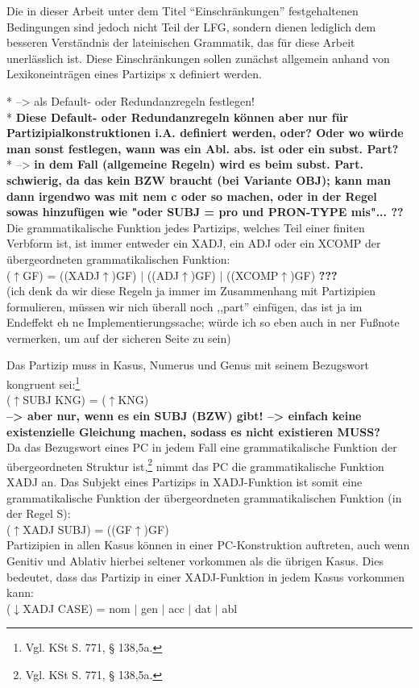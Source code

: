 \documentclass[12pt,a4paper]{article}
\begin{document}
Die in dieser Arbeit unter dem Titel ``Einschränkungen'' festgehaltenen Bedingungen sind jedoch nicht Teil der LFG, sondern dienen lediglich dem besseren Verständnis der lateinischen Grammatik, das für diese Arbeit unerlässlich ist. Diese Einschränkungen sollen zunächst allgemein anhand von Lexikoneinträgen eines Partizips x definiert werden. 

* --> als Default- oder Redundanzregeln festlegen! \\
* \textbf{Diese Default- oder Redundanzregeln können aber nur für Partizipialkonstruktionen i.A. definiert werden, oder? Oder wo würde man sonst festlegen, wann was ein Abl. abs. ist oder ein subst. Part?} \\
* --> \textbf{in dem Fall (allgemeine Regeln) wird es beim subst. Part. schwierig, da das kein BZW braucht (bei Variante OBJ); kann man dann irgendwo was mit nem c oder so machen, oder in der Regel sowas hinzufügen wie "oder SUBJ = pro und PRON-TYPE mis"... ??} \\

Die grammatikalische Funktion jedes Partizips, welches Teil einer finiten Verbform ist, ist immer entweder ein XADJ, ein ADJ oder ein XCOMP der übergeordneten grammatikalischen Funktion: \\
($\uparrow$GF) = ((XADJ$\uparrow$)GF) $\mid$ ((ADJ$\uparrow$)GF) $\mid$ ((XCOMP$\uparrow$)GF) \textbf{???} \\ 
(ich denk da wir diese Regeln ja immer im Zusammenhang mit Partizipien formulieren, müssen wir nich überall noch ,,part'' einfügen, das ist ja im Endeffekt eh ne Implementierungssache; würde ich so eben auch in ner Fußnote vermerken, um auf der sicheren Seite zu sein)

Das Partizip muss in Kasus, Numerus und Genus mit seinem Bezugswort kongruent sei:\footnote{Vgl. KSt S. 771, § 138,5a.}\\
($\uparrow$SUBJ KNG) = ($\uparrow$KNG)\\
\textbf{--> aber nur, wenn es ein SUBJ (BZW) gibt! --> einfach keine existenzielle Gleichung machen, sodass es nicht existieren MUSS?} \\

Da das Bezugswort eines PC in jedem Fall eine grammatikalische Funktion der übergeordneten Struktur ist,\footnote{Vgl. KSt S. 771, § 138,5a.} nimmt das PC die grammatikalische Funktion XADJ an. Das Subjekt eines Partizips in XADJ-Funktion ist somit eine grammatikalische Funktion der übergeordneten grammatikalischen Funktion (in der Regel S): \\
($\uparrow$XADJ SUBJ) = ((GF$\uparrow$)GF) \\
Partizipien in allen Kasus können in einer PC-Konstruktion auftreten, auch wenn Genitiv und Ablativ hierbei seltener vorkommen als die übrigen Kasus. Dies bedeutet, dass das Partizip in einer XADJ-Funktion in jedem Kasus vorkommen kann: \\
($\downarrow$XADJ CASE) = nom $\mid$ gen $\mid$ acc $\mid$ dat $\mid$ abl \\
\end{document}
